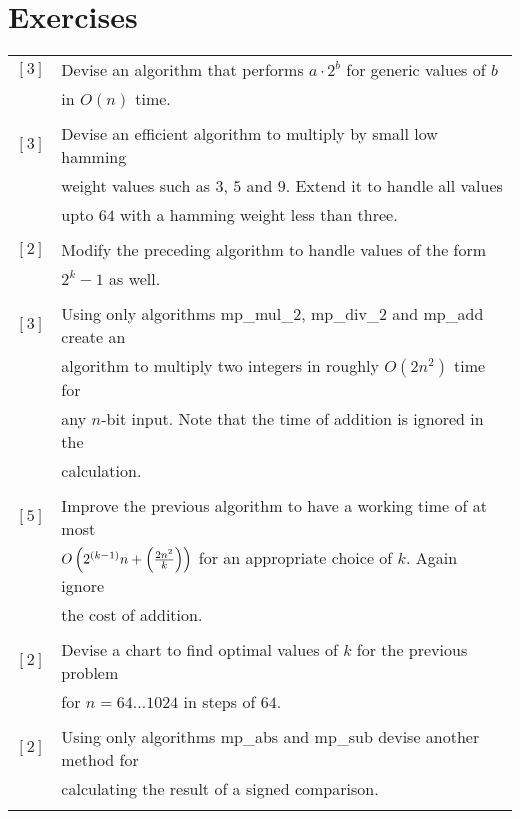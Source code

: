 \documentclass[b5paper]{book}
\begin{document}
\section*{Exercises}
\begin{tabular}{cl}
$\left [ 3 \right ] $ & Devise an algorithm that performs $a \cdot 2^b$ for generic values of $b$ \\
                      & in $O(n)$ time. \\
                      &\\
$\left [ 3 \right ] $ & Devise an efficient algorithm to multiply by small low hamming  \\
                      & weight values such as $3$, $5$ and $9$.  Extend it to handle all values \\
                      & upto $64$ with a hamming weight less than three. \\
                      &\\
$\left [ 2 \right ] $ & Modify the preceding algorithm to handle values of the form \\
                      & $2^k - 1$ as well. \\
                      &\\
$\left [ 3 \right ] $ & Using only algorithms mp\_mul\_2, mp\_div\_2 and mp\_add create an \\
                      & algorithm to multiply two integers in roughly $O(2n^2)$ time for \\
                      & any $n$-bit input.  Note that the time of addition is ignored in the \\
                      & calculation.  \\
                      & \\
$\left [ 5 \right ] $ & Improve the previous algorithm to have a working time of at most \\
                      & $O \left (2^{(k-1)}n + \left ({2n^2 \over k} \right ) \right )$ for an appropriate choice of $k$.  Again ignore \\
                      & the cost of addition. \\
                      & \\
$\left [ 2 \right ] $ & Devise a chart to find optimal values of $k$ for the previous problem \\
                      & for $n = 64 \ldots 1024$ in steps of $64$. \\
                      & \\
$\left [ 2 \right ] $ & Using only algorithms mp\_abs and mp\_sub devise another method for \\
                      & calculating the result of a signed comparison. \\
                      &
\end{tabular}
\end{document}
